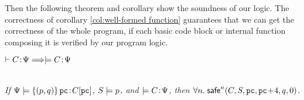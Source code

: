 Then the following theorem and corollary show the soundness
of our logic. The correctness of corollary \ref{col:well-formed function} 
guarantees that we can get the correctness of the whole program, if 
each basic code block or internal function composing it 
is verified by our program logic. 

\begin{theorem}[Soundness]
	\label{thm:code heap soundness}
	$ %
		\vdash \code \!:\! \Cspec \Longrightarrow \models \code \!:\! \Cspec
	$ %
\end{theorem}

\begin{corollary}
	\label{col:well-formed function}
	\em
	\mbox{} \\
	If $\Psi \models \{(p, q)\} \, \texttt{pc} \!:\! C[\texttt{pc}]$,
    $S \models p$, and $\models C \!:\! \Psi$,
    then $\forall n. \; \mathsf{safe}^{n} (C, S, \texttt{pc}, \texttt{pc}\!+\!4, q, 0)$.
\end{corollary}


